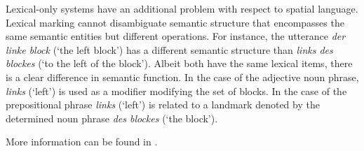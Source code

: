 Lexical-only systems have an additional 
problem with respect to spatial language. 
Lexical marking cannot disambiguate semantic 
structure that encompasses the same semantic 
entities but different operations. For instance, the utterance 
\textit{der linke block} (`the left block') has a different semantic
structure than \textit{links des blockes} (`to the left of the block'). 
Albeit both have the same lexical items, there is a clear difference 
in semantic function. In the case of the adjective noun phrase, 
\textit{links} (`left') is used as a modifier modifying the set of blocks. 
In the case of the prepositional phrase \textit{links} (`left') is related to a 
landmark denoted by the determined noun phrase \textit{des blockes} (`the block'). 

More information can be found in \citealt{spranger2012stages,spranger2013evolutionary}.

% 